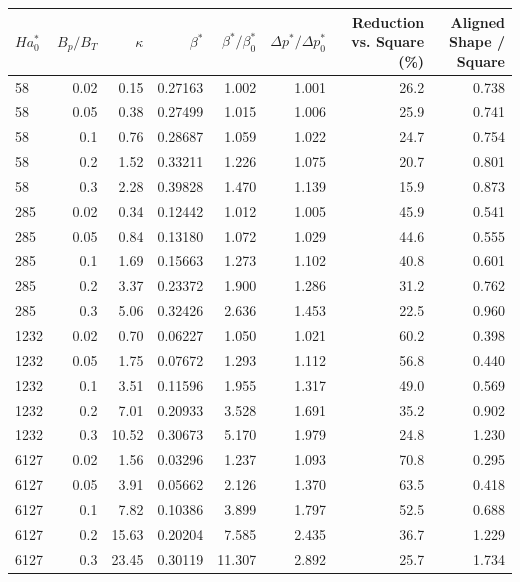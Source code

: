 \begin{tabular}{lrrrrrrr}
\toprule
$Ha^*_0$ & $B_p/B_T$ & $\kappa$ & $\beta^*$ & $\beta^*/\beta^*_0$ & $\Delta p^*/\Delta p^*_0$ & Reduction vs. Square (\%) & Aligned Shape / Square \\
\midrule
58 & 0.02 & 0.15 & 0.27163 & 1.002 & 1.001 & 26.2 & 0.738 \\
58 & 0.05 & 0.38 & 0.27499 & 1.015 & 1.006 & 25.9 & 0.741 \\
58 & 0.1 & 0.76 & 0.28687 & 1.059 & 1.022 & 24.7 & 0.754 \\
58 & 0.2 & 1.52 & 0.33211 & 1.226 & 1.075 & 20.7 & 0.801 \\
58 & 0.3 & 2.28 & 0.39828 & 1.470 & 1.139 & 15.9 & 0.873 \\
285 & 0.02 & 0.34 & 0.12442 & 1.012 & 1.005 & 45.9 & 0.541 \\
285 & 0.05 & 0.84 & 0.13180 & 1.072 & 1.029 & 44.6 & 0.555 \\
285 & 0.1 & 1.69 & 0.15663 & 1.273 & 1.102 & 40.8 & 0.601 \\
285 & 0.2 & 3.37 & 0.23372 & 1.900 & 1.286 & 31.2 & 0.762 \\
285 & 0.3 & 5.06 & 0.32426 & 2.636 & 1.453 & 22.5 & 0.960 \\
1232 & 0.02 & 0.70 & 0.06227 & 1.050 & 1.021 & 60.2 & 0.398 \\
1232 & 0.05 & 1.75 & 0.07672 & 1.293 & 1.112 & 56.8 & 0.440 \\
1232 & 0.1 & 3.51 & 0.11596 & 1.955 & 1.317 & 49.0 & 0.569 \\
1232 & 0.2 & 7.01 & 0.20933 & 3.528 & 1.691 & 35.2 & 0.902 \\
1232 & 0.3 & 10.52 & 0.30673 & 5.170 & 1.979 & 24.8 & 1.230 \\
6127 & 0.02 & 1.56 & 0.03296 & 1.237 & 1.093 & 70.8 & 0.295 \\
6127 & 0.05 & 3.91 & 0.05662 & 2.126 & 1.370 & 63.5 & 0.418 \\
6127 & 0.1 & 7.82 & 0.10386 & 3.899 & 1.797 & 52.5 & 0.688 \\
6127 & 0.2 & 15.63 & 0.20204 & 7.585 & 2.435 & 36.7 & 1.229 \\
6127 & 0.3 & 23.45 & 0.30119 & 11.307 & 2.892 & 25.7 & 1.734 \\
\bottomrule
\end{tabular}
